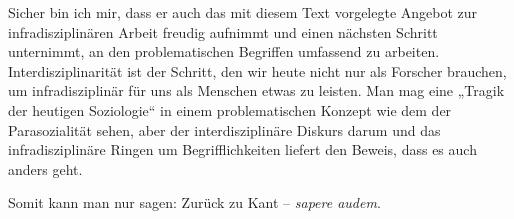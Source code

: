 \documentclass[12pt,a4paper]{article}
\begin{document}
Sicher bin ich mir, dass er auch das mit diesem Text vorgelegte Angebot zur
infradisziplinären Arbeit freudig aufnimmt und einen nächsten Schritt
unternimmt, an den problematischen Begriffen umfassend zu
arbeiten. Interdisziplinarität ist der Schritt, den wir heute nicht nur als
Forscher brauchen, um infradisziplinär für uns als Menschen etwas zu
leisten. Man mag eine „Tragik der heutigen Soziologie“ in einem problematischen
Konzept wie dem der Parasozialität sehen, aber der interdisziplinäre Diskurs
darum und das infradisziplinäre Ringen um Begrifflichkeiten liefert den Beweis,
dass es auch anders geht.

Somit kann man nur sagen: Zurück zu Kant – \emph{sapere audem}.

\ccnotiz
\end{document}
